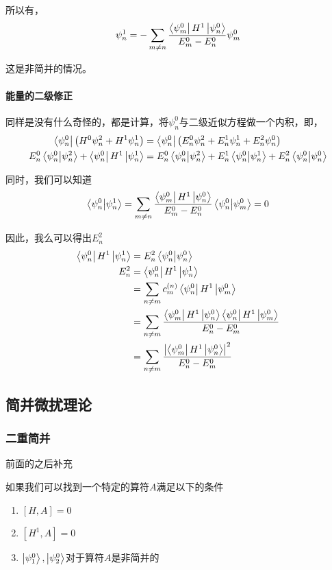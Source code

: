 \documentclass{article}
\begin{document}
所以有，
\begin{align*}
    \psi_n^1=-\sum_{m\neq n}\dfrac{\bra{\psi_m^0}H^1\ket{\psi_n^0}}{E_m^0-E_n^0}\psi_m^0
\end{align*}

这是非简并的情况。

\paragraph{能量的二级修正}
同样是没有什么奇怪的，都是计算，将$\psi_n^0$与二级近似方程做一个内积，即，
\begin{align*}
    \bra{\psi_n^0}\left(H^0\psi_n^2+H^1\psi_n^1\right)&=\bra{\psi_n^0}\left(E_n^0\psi_n^2+E_n^1\psi_n^1+E_n^2\psi_n^0\right)\\
    E_n^0\braket{\psi_n^0}{\psi_n^2}+\bra{\psi_n^0}H^1\ket{\psi_n^1}&=E_n^0\braket{\psi_n^0}{\psi_n^2}+E_n^1\braket{\psi_n^0}{\psi_n^1}+E_n^2\braket{\psi_n^0}{\psi_n^0}
\end{align*}

同时，我们可以知道
\begin{align*}
    \braket{\psi_n^0}{\psi_n^1}=\sum_{m\neq n}\dfrac{\bra{\psi_m^0}H^1\ket{\psi_n^0}}{E_m^0-E_n^0}\braket{\psi_n^0}{\psi_m^0}=0
\end{align*}

因此，我么可以得出$E_n^2$
\begin{align*}
    \bra{\psi_n^0}H^1\ket{\psi_n^1}&=E_n^2\braket{\psi_n^0}{\psi_n^0}\\
    E_n^2&=\bra{\psi_n^0}H^1\ket{\psi_n^1}\\
    &=\sum_{n\neq m}c_m^{(n)}\bra{\psi_n^0}H^1\ket{\psi_m^0}\\
    &=\sum_{n\neq m}\dfrac{\bra{\psi_m^0}H^1\ket{\psi_n^0}\bra{\psi_n^0}H^1\ket{\psi_m^0}}{E_n^0-E_m^0}\\
    &=\sum_{n\neq m}\dfrac{\left|\bra{\psi_m^0}H^1\ket{\psi_n^0}\right|^2}{E_n^0-E_m^0}
\end{align*}

\subsection{简并微扰理论}
\subsubsection{二重简并}

前面的之后补充

如果我们可以找到一个特定的算符$A$满足以下的条件
\begin{enumerate}
    \item $[H,A]=0$
    \item $[H^1,A]=0$
    \item $\ket{\psi_1^0},\ket{\psi_2^0}$对于算符$A$是非简并的
\end{enumerate}
\end{document}
